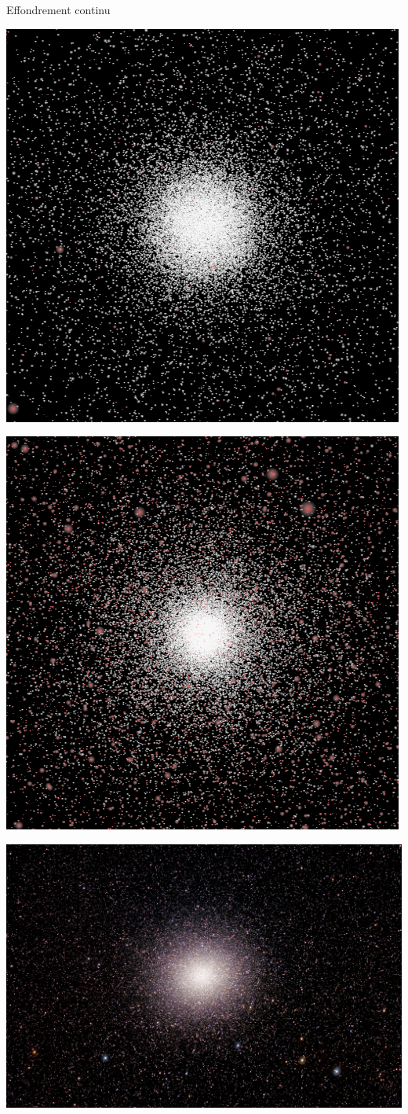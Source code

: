 \documentclass[slidetop,12pt,ucs]{beamer}
\renewcommand{\(}{\ensuremath{\left(}}
\renewcommand{\)}{\ensuremath{\right)}}
\begin{document}
			\begin{frame}[t]{Effondrement continu}
					\begin{minipage}{0.50\linewidth}
						\centering \includegraphics[width=0.7\linewidth]{None_130.png}
					\end{minipage}\hfill
					\begin{minipage}{0.50\linewidth}
						\centering \includegraphics[width=0.7\linewidth]{None_3000.png}
					\end{minipage}
					\begin{minipage}{.5\linewidth}
						\centering \includegraphics[width=0.7\linewidth]{graphe/ngc5139_w-cen_HD-2.png}

\end{minipage}
\end{frame}
\end{document}
